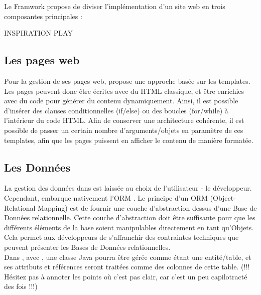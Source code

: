 Le Framwork \kwplay{} propose de diviser l'implémentation d'un site web en trois composantes principales :


{\huge INSPIRATION PLAY}
\subsection{Les pages web}
Pour la gestion de ses pages web, \kwplay{} propose une approche basée sur les templates. Les pages peuvent donc être écrites avec du HTML classique, et être enrichies avec du code \kwscala{} pour générer du contenu dynamiquement. Ainsi, il est possible d'insérer des clauses conditionnelles (if/else) ou des boucles (for/while) à l'intérieur du code HTML. Afin de conserver une architecture cohérente, il est possible de passer un certain nombre d'arguments/objets en paramètre de ces templates, afin que les pages puissent en afficher le contenu de manière formatée.

\subsection{Les Données}
La gestion des données dans \kwplay{} est laissée au choix de l'utilisateur - le développeur. Cependant, \kwplay{} embarque nativement l'ORM \kwebean{}. Le principe d'un ORM (Object-Relational Mapping) est de fournir une couche d'abstraction dessus d'une Base de Données relationnelle. Cette couche d'abstraction doit être suffisante pour que les différents éléments de la base soient manipulables directement en tant qu'Objets. Cela permet aux développeurs de s'affranchir des contraintes techniques que peuvent présenter les Bases de Données relationnelles.\\
Dans \kwplay{}, avec \kwebean{}, une classe Java pourra être gérée comme étant une entité/table, et ses attributs et références seront traitées comme des colonnes de cette table.
(!!! Hésitez pas à annoter les points où c'est pas clair, car c'est un peu capilotracté des fois !!!)

